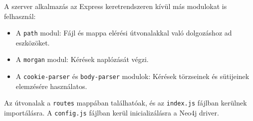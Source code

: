 A szerver alkalmazás az Express keretrendszeren kívül más modulokat is felhasznál:
\begin{itemize}
    \item A \texttt{path} modul: Fájl és mappa elérési útvonalakkal való dolgozáshoz ad eszközöket.
    \item A \texttt{morgan} modul: Kérések naplózását végzi.
    \item A \texttt{cookie-parser} és \texttt{body-parser} modulok: Kérések törzseinek és sütijeinek elemzésére használatos.
\end{itemize}

Az útvonalak a \texttt{routes} mappában találhatóak, és az \texttt{index.js} fájlban kerülnek importálásra. A \texttt{config.js} fájlban kerül inicializálásra a Neo4j driver.
